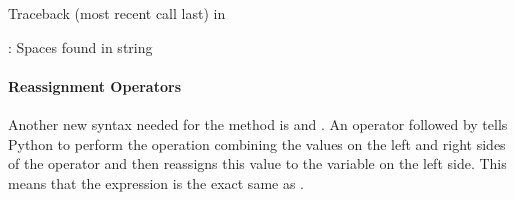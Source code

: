 \documentclass[letterpaper,10pt,english]{jupyterBook}
\begin{document}
\begin{sphinxVerbatim}[commandchars=\\\{\}]
Traceback (most recent call last)
 in 
   
      

: Spaces found in string
\end{sphinxVerbatim}


\paragraph{Reassignment Operators}
\label{\detokenize{content/07-game-theory/python-classes:reassignment-operators}}
\sphinxAtStartPar
Another new syntax needed for the  method is \sphinxcode{\sphinxupquote{+=}} and \sphinxcode{\sphinxupquote{\sphinxhyphen{}=}}. An operator followed by \sphinxcode{\sphinxupquote{=}} tells Python to perform the operation combining the values on the left and right sides of the operator and then reassigns this value to the variable on the left side. This means that the expression  is the exact same as .
\end{document}

